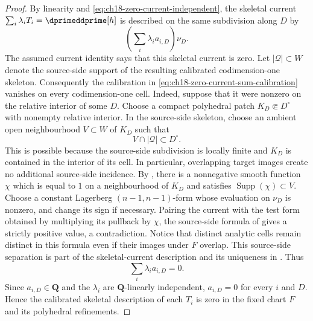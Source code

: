 \begin{proof}
By linearity and \eqref{eq:ch18-zero-current-independent}, the skeletal
current $\sum_i\lambda_iT_i=\dprimeddprime[h]$ is described on the same
subdivision along $D$ by
\begin{equation}
\label{eq:ch18-zero-current-sum-calibration}
                         \left(\sum_i\lambda_i a_{i,D}\right)\nu_D.
\end{equation}
The assumed current identity says that this skeletal current is zero.  Let
$|\mathscr Q|\subset W$ denote the source-side support of the resulting
calibrated codimension-one skeleton.  Consequently the calibration in
\eqref{eq:ch18-zero-current-sum-calibration} vanishes on every
codimension-one cell.  Indeed, suppose that it were nonzero on the relative
interior of some $D$.  Choose a compact polyhedral patch
$K_D\Subset D^\circ$ with nonempty relative interior.  In the source-side
skeleton, choose an ambient open neighbourhood $V\subset W$ of $K_D$ such
that
\[
                         V\cap|\mathscr Q|\subset D^\circ.
\]
This is possible because the source-side subdivision is locally finite and
$K_D$ is contained in the interior of its cell.  In particular, overlapping
target images create no additional source-side incidence.  By
\cite[Corollary~6.2.4]{CLD25}, there is a nonnegative smooth function $\chi$
which is equal to $1$ on a neighbourhood of $K_D$ and satisfies
$\operatorname{Supp}(\chi)\subset V$.
Choose a constant Lagerberg $(n-1,n-1)$-form whose evaluation on $\nu_D$ is
nonzero, and change its sign if necessary.  Pairing the current with the
test form obtained by multiplying its pullback by $\chi$, the source-side
formula of \cite[Definition~7.5.1]{CLD25} gives a strictly positive value, a
contradiction.  Notice that distinct analytic cells remain distinct in this
formula even if their images under $F$ overlap.  This source-side separation
is part of the skeletal-current description and its uniqueness in
\cite[Definition~7.5.1 and Propositions~7.5.7--7.5.8]{CLD25}.  Thus
\[
                         \sum_i\lambda_i a_{i,D}=0.
\]
Since $a_{i,D}\in\mathbf Q$ and the $\lambda_i$ are $\mathbf Q$-linearly
independent, $a_{i,D}=0$ for every $i$ and $D$.  Hence the calibrated
skeletal description of each $T_i$ is zero in the fixed chart $F$ and its
polyhedral refinements.


\end{proof}
